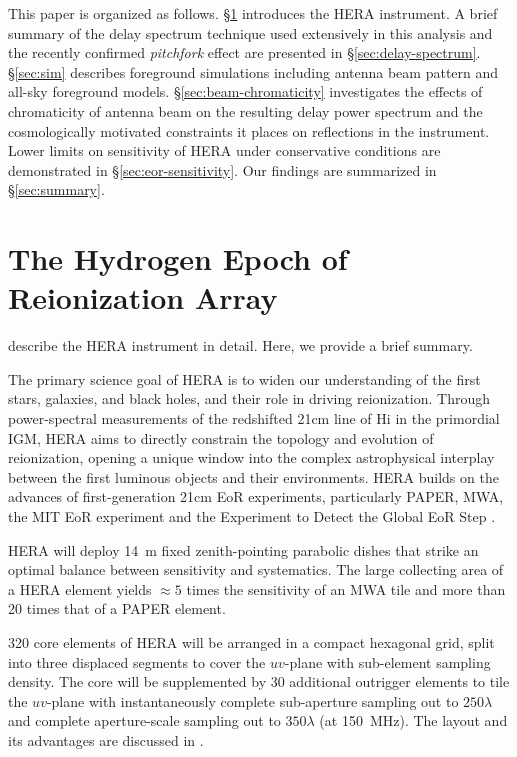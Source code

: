 \documentclass[preprint2,iop,numberedappendix,twocolappendix,appendixfloats]{emulateapj}
\begin{document}
This paper is organized as follows. \S\ref{sec:HERA} introduces the HERA instrument. A brief summary of the delay spectrum technique used extensively in this analysis and the recently confirmed {\it pitchfork} effect are presented in \S\ref{sec:delay-spectrum}. \S\ref{sec:sim} describes foreground simulations including antenna beam pattern and all-sky foreground models. \S\ref{sec:beam-chromaticity} investigates the effects of chromaticity of antenna beam on the resulting delay power spectrum and the cosmologically motivated constraints it places on reflections in the instrument. Lower limits on sensitivity of HERA under conservative conditions are demonstrated in \S\ref{sec:eor-sensitivity}. Our findings are summarized in \S\ref{sec:summary}.

\section{The Hydrogen Epoch of Reionization Array}\label{sec:HERA}

\citet{deb16} describe the HERA instrument in detail. Here, we provide a brief summary.

The primary science goal of HERA is to widen our understanding of the first stars, galaxies, and black holes, and their role in driving reionization. Through power-spectral measurements of the redshifted 21cm line of H{\sc i} in the primordial IGM, HERA aims to directly constrain the topology and evolution of reionization, opening a unique window into the complex astrophysical interplay between the first luminous objects and their environments. HERA builds on the advances of first-generation 21cm EoR experiments, particularly PAPER, MWA, the MIT EoR experiment \citep[MITEoR;][]{zhe14} and the Experiment to Detect the Global EoR Step \citep[EDGES;][]{bow10}.

HERA will deploy 14~m fixed zenith-pointing parabolic dishes that strike an optimal balance between sensitivity and systematics. The large collecting area of a HERA element yields $\approx 5$ times the sensitivity of an MWA tile and more than 20 times that of a PAPER element. 

320 core elements of HERA will be arranged in a compact hexagonal grid, split into three displaced segments to cover the $uv$-plane with sub-element sampling density. The core will be supplemented by 30 additional outrigger elements to tile the $uv$-plane with instantaneously complete sub-aperture sampling out to $250\lambda$ and complete aperture-scale sampling out to $350\lambda$ (at 150~MHz). The layout and its advantages are discussed in \citet{dil16}.
\end{document}
